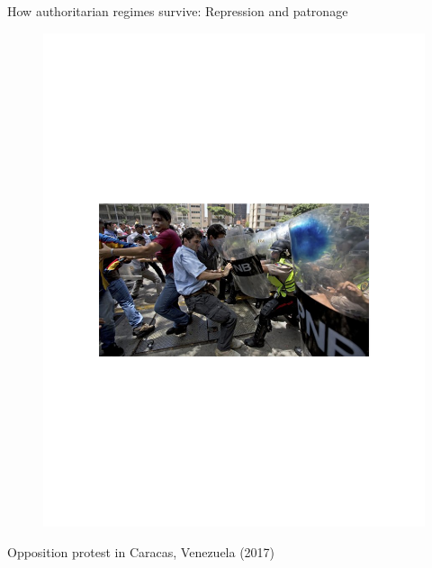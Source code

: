 \documentclass[10pt]{beamer}
\begin{document}
\begin{frame}{How authoritarian regimes survive: Repression and patronage}
	\begin{figure}
	\centering
	\includegraphics[scale=0.48]{Figs/repression}
	\end{figure}
	\begin{center}
	Opposition protest in Caracas, Venezuela (2017)
	\end{center}
\end{frame}
\end{document}
